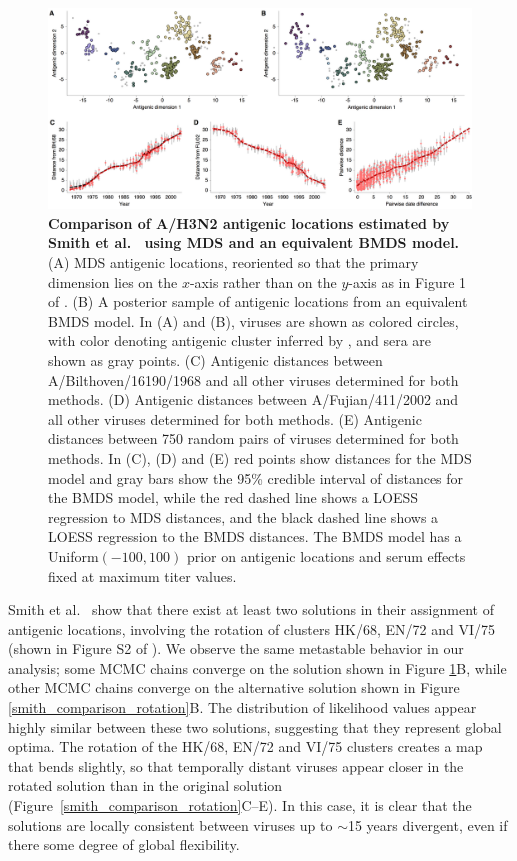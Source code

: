 \documentclass[11pt,oneside,letterpaper]{article}
\begin{document}
\begin{figure}[h]
	\centering		
	\includegraphics[width=1.0\textwidth]{figures/smith_comparison}
	\caption{\textbf{Comparison of A/H3N2 antigenic locations estimated by Smith et al.\ \cite{Smith04} using MDS and an equivalent BMDS model.} 
	(A) MDS antigenic locations, reoriented so that the primary dimension lies on the $x$-axis rather than on the $y$-axis as in Figure 1 of \cite{Smith04}.
	(B) A posterior sample of antigenic locations from an equivalent BMDS model.
	In (A) and (B), viruses are shown as colored circles, with color denoting antigenic cluster inferred by \cite{Smith04}, and sera are shown as gray points.
	(C) Antigenic distances between A/Bilthoven/16190/1968 and all other viruses determined for both methods.
	(D) Antigenic distances between A/Fujian/411/2002 and all other viruses determined for both methods.
	(E) Antigenic distances between 750 random pairs of viruses determined for both methods.	
	In (C), (D) and (E) red points show distances for the MDS model and gray bars show the 95\% credible interval of distances for the BMDS model, while the red dashed line shows a LOESS regression to MDS distances, and the black dashed line shows a LOESS regression to the BMDS distances.
	The BMDS model has a Uniform$(-100,100)$ prior on antigenic locations and serum effects fixed at maximum titer values. 
	} 
	\label{smith_comparison} 
\end{figure}

Smith et al.\ \cite{Smith04} show that there exist at least two solutions in their assignment of antigenic locations, involving the rotation of clusters HK/68, EN/72 and VI/75 (shown in Figure S2 of \cite{Smith04}).
We observe the same metastable behavior in our analysis; some MCMC chains converge on the solution shown in Figure \ref{smith_comparison}B, while other MCMC chains converge on the alternative solution shown in Figure \ref{smith_comparison_rotation}B.
The distribution of likelihood values appear highly similar between these two solutions, suggesting that they represent global optima.
The rotation of the HK/68, EN/72 and VI/75 clusters creates a map that bends slightly, so that temporally distant viruses appear closer in the rotated solution than in the original solution (Figure~\ref{smith_comparison_rotation}C--E).
In this case, it is clear that the solutions are locally consistent between viruses up to $\sim$15 years divergent, even if there some degree of global flexibility.
\end{document}
